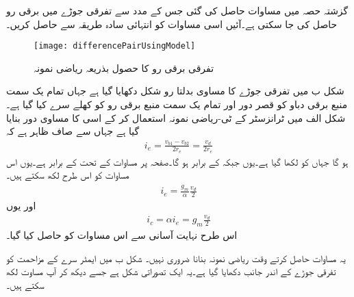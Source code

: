  گزشتہ حصہ میں مساوات   حاصل کی گئی جس کے مدد سے تفرقی جوڑے میں برقی رو    حاصل کی جا سکتی ہے۔آئیں اسی مساوات کو انتہائی سادہ طریقہ سے  حاصل کریں۔
\begin{figure}
\centering
\texttt{[image: differencePairUsingModel]}
\caption{تفرقی برقی رو کا حصول بذریعہ ریاضی نمونہ}
\label{شکل_تفرقی_رو_بذریعہ_ماڈل}
\end{figure}
شکل  ب میں تفرقی جوڑے کا مساوی بدلتا رو شکل دکھایا گیا ہے جہاں تمام یک سمت منبع برقی دباو کو قصر دور  اور تمام یک سمت منبع برقی رو کو کھلے سرے  کیا گیا ہے۔شکل  الف میں ٹرانزسٹر کے ٹی-ریاضی نمونہ استعمال کر کے اسی کا مساوی دور بنایا گیا ہے جہاں سے صاف ظاہر ہے کہ
\begin{align}
i_e=\frac{v_{b1}-v_{b2}}{2 r_e}=\frac{v_d}{2 r_e}
\end{align}
ہو گا جہاں   کو  لکھا گیا ہے۔یوں  جبکہ  کے برابر ہو گا۔صفحہ  پر مساوات  کے تحت  کے برابر ہے۔یوں اس مساوات کو اس طرح لکھ سکتے ہیں۔
\begin{align}
i_e=\frac{g_m}{\alpha} \frac{v_d}{2}
\end{align}
اور یوں
\begin{align}
i_c = \alpha i_e = g_m \frac{v_d}{2}
\end{align}
اس طرح نہایت آسانی سے اس مساوات کو حاصل کیا گیا۔

یہ مساوات حاصل کرتے وقت ریاضی نمونہ بنانا ضروری نہیں۔ شکل  ب میں ایمٹر سرے کے مزاحمت  کو تفرقی جوڑے کے اندر جانب دکھایا گیا ہے۔یہ ایک تصوراتی شکل ہے جسے دیکھ کر آپ مساوت  لکھ سکتے ہیں۔

